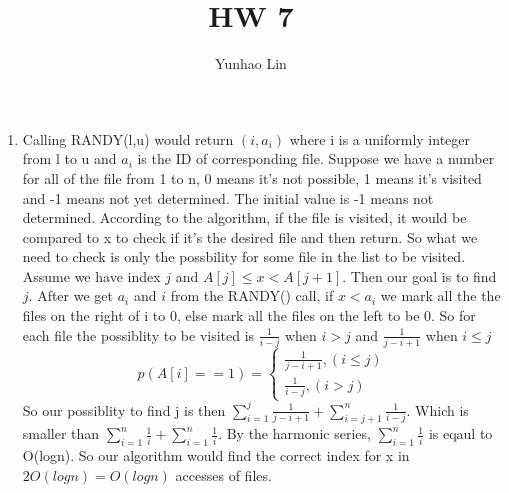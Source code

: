 \documentclass[14pt]{article}
\title{HW 7}
\author{Yunhao Lin}
\begin{document}
\maketitle
\begin{enumerate}
    
    \item Calling RANDY(l,u) would return $(i,a_i)$ where i is a uniformly integer
    from l to u and $a_i$ is the ID of corresponding file. Suppose we have a number
    for all of the file from 1 to n, 0 means it's not possible, 1 means it's visited
    and -1 means not yet determined. The initial value is -1 means not determined. 
    According to the algorithm, if the file is visited, it would be compared to x 
    to check if it's the desired file and then return. So what we need to check is
    only the possbility for some file in the list to be visited. \\
    Assume we have index $j$ and $A[j] \leq x < A[j+1]$. Then our goal is to find
    $j$.
    After we get $a_i$ and $i$ from the RANDY() call, if $x < a_i$ we mark all the 
    the files on the right of i to 0, else mark all the files on the left to be 0.
    So for each file the possiblity to be visited is $\frac{1}{i-j}$ when $i > j$ and
    $\frac{1}{j-i+1}$ when $i \leq j$  \\
    \[
    p(A[i] == 1) = \left\{
                \begin{array}{ll}
                    \frac{1}{j-i+1},   (i \leq j)\\
                    \frac{1}{i-j}, (i>j)    
                \end{array}
              \right.
    \]
    So our possiblity to find j is then $\sum_{i=1}^j \frac{1}{j-i+1} + \sum_{i=j+1}^n
    \frac{1}{i-j}$. Which is smaller than $\sum_{i=1}^n \frac{1}{i} + \sum_{i=1}^n \frac{1}{i}
    $. By the harmonic series, $\sum_{i=1}^n \frac{1}{i}$ is eqaul to O(logn).
    So our algorithm would find the correct index for x in $2O(logn) = O(logn)$
    accesses of files.  
   

\end{enumerate}
\end{document}
